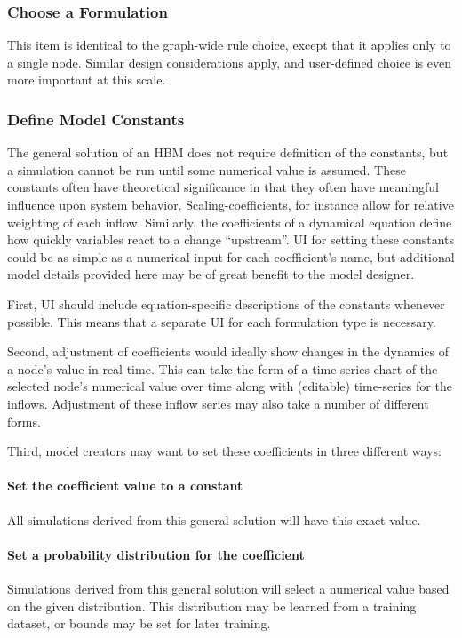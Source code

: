 \documentclass[conference]{IEEEtran}
\begin{document}
\subsubsection{Choose a Formulation}
This item is identical to the graph-wide rule choice, except that it applies only to a single node. Similar design considerations apply, and user-defined choice is even more important at this scale.

\subsubsection{Define Model Constants}
The general solution of an HBM does not require definition of the constants, but a simulation cannot be run until some numerical value is assumed. 
These constants often have theoretical significance in that they often have meaningful influence upon system behavior. 
Scaling-coefficients, for instance allow for relative weighting of each inflow. 
Similarly, the coefficients of a dynamical equation define how quickly variables react to a change ``upstream''.
UI for setting these constants could be as simple as a numerical input for each coefficient's name, but additional model details provided here may be of great benefit to the model designer. 

First, UI should include equation-specific descriptions of the constants whenever possible. This means that a separate UI for each formulation type is necessary. 

Second, adjustment of coefficients would ideally show changes in the dynamics of a node's value in real-time. 
This can take the form of a time-series chart of the selected node's numerical value over time along with (editable) time-series for the inflows. 
Adjustment of these inflow series may also take a number of different forms. 

Third, model creators may want to set these coefficients in three different ways: 
\paragraph{ Set the coefficient value to a constant}
All simulations derived from this general solution will have this exact value.

\paragraph{ Set a probability distribution for the coefficient}
Simulations derived from this general solution will select a numerical value based on the given distribution. 
This distribution may be learned from a training dataset, or bounds may be set for later training. 
\end{document}
